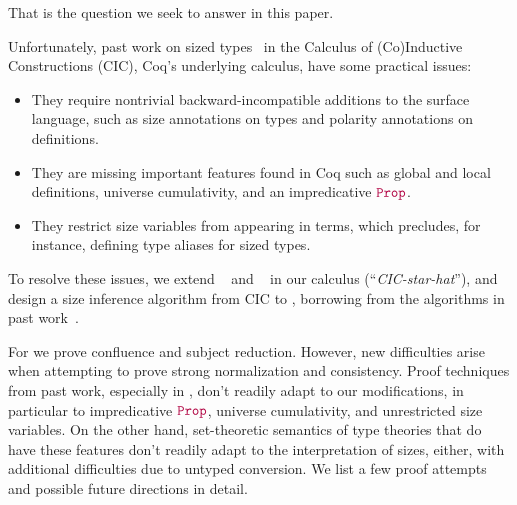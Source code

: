 \noindent That is the question we seek to answer in this paper.

Unfortunately, past work on sized types~\citep{cic-hat, cic-hat-minus} in the Calculus of (Co)\-Inductive Constructions (CIC), Coq's underlying calculus, have some practical issues:

\begin{itemize}
    \item They require nontrivial backward-incompatible additions to the surface language,
      such as size annotations on \cofixpoint types and polarity annotations on \coinductive definitions.
    \item They are missing important features found in Coq such as global and local definitions,
      universe cumulativity, and an impredicative $\Prop$.
    \item They restrict size variables from appearing in terms, which precludes, for instance,
      defining type aliases for sized types.
\end{itemize}

To resolve these issues, we extend \CIChat~\citep{cic-hat} and \CIChatminus~\citep{cic-hat-minus-nat,cic-hat-minus} in our calculus \textbf{\lang} (``\emph{CIC-star-hat}''),
and design a size inference algorithm from CIC to \lang,
borrowing from the algorithms in past work~\citep{f-hat, cic-hat, cc-hat-omega}.

For \lang we prove confluence and subject reduction.
However, new difficulties arise when attempting to prove strong normalization and consistency.
Proof techniques from past work, especially in \citet{cic-hat-minus}, don't readily adapt to our modifications,
in particular to impredicative $\Prop$, universe cumulativity, and unrestricted size variables.
On the other hand, set-theoretic semantics of type theories that do have these features don't readily adapt to the interpretation of sizes, either,
with additional difficulties due to untyped conversion.
We list a few proof attempts and possible future directions in detail.


\iffalse
However, in attempting to recover backward-compatibility and the entire feature set of Coq,
we run into new theoretical problems.
Proving strong normalization and consistency of the new language becomes difficult compared to pure CIC, for reasons that seem intrinsic.
Some of the design goals of CIC --- untyped reduction, orthogonality to classical axioms --- seem at odds with set theoretical models that include sized types.
Some of these might be solvable if we could sacrifice backward compatibility.
Even if they are solvable, the complexity of these models would at least sacrifice trust in the core of Coq.
We discuss our models and the meta-theory of \lang in detail.
\fi


